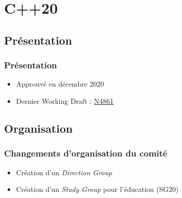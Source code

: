 \documentclass[C++.tex]{subfiles}
\begin{document}
\section{C++20}
\subsection*{Présentation}
\begin{frame}
	\frametitle{Présentation}
	\begin{itemize}
		\item Approuvé en décembre 2020
		\item Dernier Working Draft : \href{https://github.com/cplusplus/draft/releases/download/n4861/n4861.pdf}{N4861\linklogo}
	\end{itemize}
\end{frame}

\subsection*{Organisation}
\begin{frame}
	\frametitle{Changements d'organisation du comité}
	\begin{itemize}
		\item Création d'un \textit{Direction Group}
		\item Création d'un \textit{Study Group} pour l'éducation (SG20)
	\end{itemize}

	\centering
\end{frame}
\end{document}

